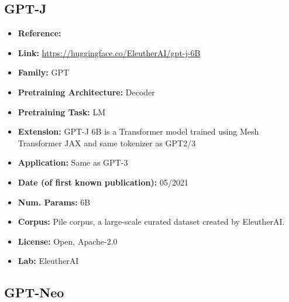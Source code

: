 \documentclass{article}
\begin{document}
\subsection{GPT-J}
            \begin{itemize}
                \item \textbf{Reference:} 
                \item \textbf{Link:} \url{https://huggingface.co/EleutherAI/gpt-j-6B}
                \item \textbf{Family:} GPT 
                \item \textbf{Pretraining Architecture:} Decoder
                \item \textbf{Pretraining Task:} LM
                \item \textbf{Extension:} GPT-J 6B is a Transformer model trained using Mesh Transformer JAX and same tokenizer as GPT2/3  
                \item \textbf{Application:} Same as GPT-3
                \item \textbf{Date (of first known publication):} 05/2021
                \item \textbf{Num. Params:} 6B
                \item \textbf{Corpus:} Pile corpus, a large-scale curated dataset created by EleutherAI.
                \item \textbf{License:} Open, Apache-2.0
                \item \textbf{Lab:} EleutherAI
            \end{itemize}
            
\subsection{GPT-Neo}
\end{document}
